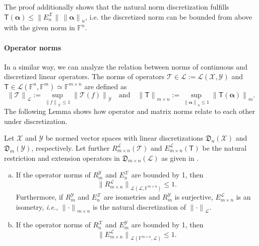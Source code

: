 \documentclass[a4paper]{paper}
\newcommand{\Discr}{\mathfrak{D}}
\newcommand{\Spc}[1]{\mathscr{#1}}
\newcommand{\Field}{\mathbb{F}}
\newcommand{\Op}[1]{\mathcal{#1}}
\newcommand{\DiscOp}[1]{\mathsf{#1}}
\newcommand*{\EXT}[2]{\ensuremath{E_{#1}^{#2}}}
\newcommand*{\REST}[2]{\ensuremath{R_{#1}^{#2}}}
\newcommand*{\RnX}{\ensuremath{\REST{n}{\Spc{X}}}}
\newcommand*{\RmY}{\ensuremath{\REST{m}{\Spc{Y}}}}
\newcommand*{\EnX}{\ensuremath{\EXT{n}{\Spc{X}}}}
\newcommand*{\EmY}{\ensuremath{\EXT{m}{\Spc{Y}}}}
\newcommand{\ie}{\textsl{i.e.}\xspace}
\newcommand{\valpha}{\boldsymbol{\alpha}}
\newcommand*{\NORM}[1]{\ensuremath{\lVert #1 \rVert}}
\begin{document}
\begin{remark}
 The proof additionally shows that the natural norm discretization fulfills
 $\DiscOp{T}(\valpha) \leq \NORM{\EnX}\, \NORM{\valpha}_n$, i.e. the discretized norm can be bounded from above 
 with the given norm in $\Field^n$.
\end{remark}


\paragraph{Operator norms}

In a similar way, we can analyze the relation between norms of continuous and discretized linear operators. 
The norms of operators $\Op{T} \in \Spc{L} := \Spc{L}(\Spc{X}, \Spc{Y})$ and 
$\DiscOp{T} \in \Spc{L}(\Field^n, \Field^m) \simeq \Field^{m\times n}$ are defined as
%
\begin{equation*}
 \NORM{\Op{T}}_{\Spc{L}} := \sup_{\NORM{f}_{\Spc{X}} \leq 1} \NORM{\Op{T}(f)}_{\Spc{Y}}
 \quad \text{and} \quad
 \NORM{\DiscOp{T}}_{m\times n} := \sup_{\NORM{\valpha}_n \leq 1} \NORM{\DiscOp{T}(\valpha)}_m.
\end{equation*}
%
The following Lemma shows how operator and matrix norms relate to each other under discretization.

\begin{lemma}
 \label{lemma:prop:norm:op_norm_est}
 Let $\Spc{X}$ and $\Spc{Y}$ be normed vector spaces with linear discretizations $\Discr_n(\Spc{X})$ and 
 $\Discr_m(\Spc{Y})$, respectively. Let further $\REST{m\times n}{\Spc{L}}(\Op{T})$ and 
 $\EXT{m\times n}{\Spc{L}}(\DiscOp{T})$ be the natural restriction and extension operators in 
 $\Discr_{m\times n}(\Spc{L})$ as given in .
 \begin{enumerate}[(a)]
  \item \label{lemma:prop:norm:op_norm_est:a_rest}
  If the operator norms of $\RmY$ and $\EnX$ are bounded by 1, then
  \begin{equation*}
   \NORM{R_{m\times n}^{\Spc{L}}}_{\Spc{L}(\Spc{L},\Field^{m\times n})} \leq 1.
  \end{equation*}
  Furthermore, if $\RmY$ and $\EnX$ are isometries and $\RmY$ is surjective, $\EXT{m\times n}{\Spc{L}}$ is an 
  isometry, \ie, $\NORM{\cdot}_{m\times n}$ is the natural discretization of $\NORM{\cdot}_{\Spc{L}}$.
  
  \item \label{lemma:prop:norm:op_norm_est:b_ext}
  If the operator norms of $\RnX$ and $\EmY$ are bounded by 1, then
  \begin{equation*}
   \NORM{E_{m\times n}^{\Spc{L}}}_{\Spc{L}(\Field^{m\times n}, \Spc{L})} \leq 1.
  \end{equation*}
 \end{enumerate}
\end{lemma}
\end{document}
